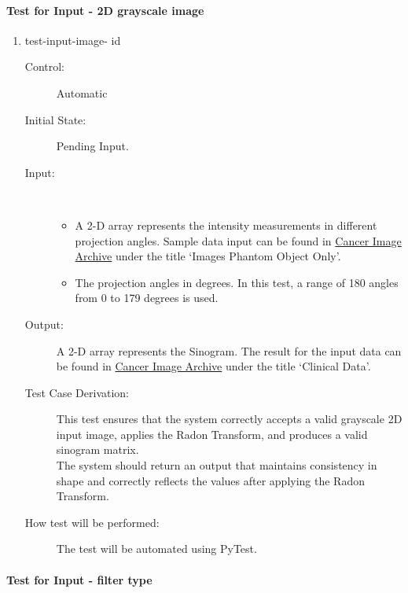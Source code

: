 \documentclass[12pt, titlepage]{article}
\newcounter{testnum}
\newcommand{\dthetestnum}{id\thetestnum}
\begin{document}
\paragraph{Test for Input - 2D grayscale image}
\begin{enumerate}
\item{test-input-image- \label{id1}\dthetestnum}
\begin{description}
\item[Control:] Automatic

\item[Initial State:] Pending Input.

\item[Input:] \hfill \\
  \begin{itemize}
  \item A 2-D array represents the intensity measurements in different projection
    angles. Sample data input can be found in
    \href{https://www.cancerimagingarchive.net/collection/ldct-and-projection-data/}{Cancer
      Image Archive} under the title \lq Images Phantom Object Only\rq.
  \item  The projection angles in degrees. In this test, a range of 180 angles from 0 to
    179 degrees is used.
  \end{itemize}

\item[Output:] A 2-D array represents the Sinogram. The result for the input data
  can be found in
  \href{https://www.cancerimagingarchive.net/collection/ldct-and-projection-data/}{Cancer
    Image Archive} under the title \lq Clinical Data\rq.

\item[Test Case Derivation:] This test ensures that the system correctly accepts a
  valid grayscale 2D input image, applies the Radon Transform, and produces a
  valid sinogram matrix. \\
  The system should return an output that maintains consistency in shape and
  correctly reflects the values after applying the Radon Transform.

\item[How test will be performed:] The test will be automated using PyTest.
\end{description}
\end{enumerate}

\paragraph{Test for Input - filter type}
\end{document}
